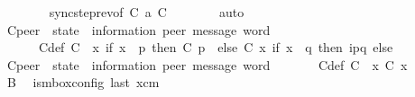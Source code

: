 \begin{isabellebody}
\ \ \ \ \ \ \isamarkupfalse%
\ sync{\isacharunderscore}{\kern0pt}step{\isacharunderscore}{\kern0pt}rev{\isacharbrackleft}{\kern0pt}of\ C{}\ a\ C{\isacharbrackright}{\kern0pt}\isanewline
\ \ \ \ \ \ \isamarkupfalse%
\ auto\isanewline
\ \ \ \ \isamarkupfalse%
\ C{}{\isacharcolon}{\kern0pt}{\isacharcolon}{\kern0pt}{\isachardoublequoteopen}{\isacharprime}{\kern0pt}peer\ {\isasymRightarrow}\ {\isacharparenleft}{\kern0pt}{\isacharprime}{\kern0pt}state\ {\isasymtimes}\ {\isacharparenleft}{\kern0pt}{\isacharprime}{\kern0pt}information{\isacharcomma}{\kern0pt}\ {\isacharprime}{\kern0pt}peer{\isacharparenright}{\kern0pt}\ message\ word{\isacharparenright}{\kern0pt}{\isachardoublequoteclose}\ \isanewline
\ \ \ \ \ \ C{}{\isacharunderscore}{\kern0pt}def{\isacharcolon}{\kern0pt}\ {\isachardoublequoteopen}C{}\ {\isasymequiv}\ {\isasymlambda}x{\isachardot}{\kern0pt}\ if\ x\ {\isacharequal}{\kern0pt}\ p\ then\ {\isacharparenleft}{\kern0pt}C\ p{\isacharcomma}{\kern0pt}\ {\isasymepsilon}{\isacharparenright}{\kern0pt}\ else\ {\isacharparenleft}{\kern0pt}C{}\ x{\isacharcomma}{\kern0pt}\ if\ x\ {\isacharequal}{\kern0pt}\ q\ then\ {\isacharbrackleft}{\kern0pt}i\isactrlbsup p{\isasymrightarrow}q\isactrlesup {\isacharbrackright}{\kern0pt}\ else\ {\isasymepsilon}{\isacharparenright}{\kern0pt}{\isachardoublequoteclose}\isanewline
\ \ \ \ \isamarkupfalse%
\ C{}{\isacharcolon}{\kern0pt}{\isacharcolon}{\kern0pt}{\isachardoublequoteopen}{\isacharprime}{\kern0pt}peer\ {\isasymRightarrow}\ {\isacharparenleft}{\kern0pt}{\isacharprime}{\kern0pt}state\ {\isasymtimes}\ {\isacharparenleft}{\kern0pt}{\isacharprime}{\kern0pt}information{\isacharcomma}{\kern0pt}\ {\isacharprime}{\kern0pt}peer{\isacharparenright}{\kern0pt}\ message\ word{\isacharparenright}{\kern0pt}{\isachardoublequoteclose}\ \isanewline
\ \ \ \ \ \ C{}{\isacharunderscore}{\kern0pt}def{\isacharcolon}{\kern0pt}\ {\isachardoublequoteopen}C{}\ {\isasymequiv}\ {\isasymlambda}x{\isachardot}{\kern0pt}\ {\isacharparenleft}{\kern0pt}C\ x{\isacharcomma}{\kern0pt}\ {\isasymepsilon}{\isacharparenright}{\kern0pt}{\isachardoublequoteclose}\isanewline
\ \ \ \ \isamarkupfalse%
\ B{}\ \isamarkupfalse%
\ {\isachardoublequoteopen}is{\isacharunderscore}{\kern0pt}mbox{\isacharunderscore}{\kern0pt}config\ {\isacharparenleft}{\kern0pt}last\ {\isacharparenleft}{\kern0pt}{\isasymC}\isactrlsub {\isasymI}\isactrlsub {\isasymmm}{\isacharhash}{\kern0pt}xcm{\isacharparenright}{\kern0pt}{\isacharparenright}{\kern0pt}{\isachardoublequoteclose}\isanewline

\end{isabellebody}
